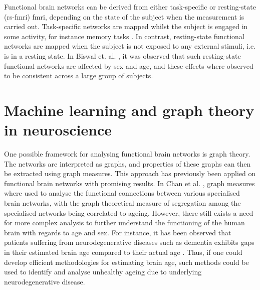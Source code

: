 Functional brain networks can be derived from either task-specific or resting-state (\acrshort{rs-fmri}) \acrshort{fmri}, depending on the state of the subject when the measurement is carried out. Task-specific networks are mapped whilst the subject is engaged in some activity, for instance memory tasks \cite{grady}. In contrast, resting-state functional networks are mapped when the subject is not exposed to any external stimuli, i.e. is in a resting state. In Biswal et. al. \cite{biswal}, it was observed that such resting-state functional networks are affected by sex and age, and these effects where observed to be consistent across a large group of subjects.

\section{Machine learning and graph theory in neuroscience}

One possible framework for analysing functional brain networks is graph theory. The networks are interpreted as graphs, and properties of these graphs can then be extracted using graph measures. This approach has previously been applied on functional brain networks with promising results. In Chan et al. \cite{chan}, graph measures where used to analyse the functional connections between various specialised brain networks, with the graph theoretical measure of segregation among the specialised networks being correlated to ageing. However, there still exists a need for more complex analysis to further understand the functioning of the human brain with regards to age and sex. For instance, it has been observed that patients suffering from neurodegenerative diseases such as dementia exhibits gaps in their estimated brain age compared to their actual age \cite{kaufmann}. Thus, if one could develop efficient methodologies for estimating brain age, such methods could be used to identify and analyse unhealthy ageing due to underlying neurodegenerative disease. 

